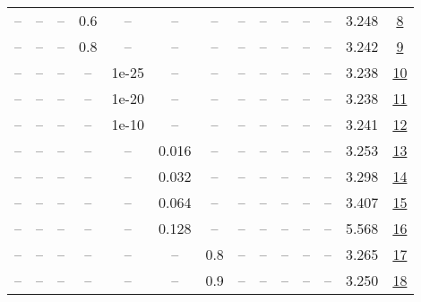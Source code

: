 \begin{table}[H]
\begin{tabular}{cccccccccccccc}
-- & -- & -- & 0.6 & -- & -- & -- & -- & -- & -- & -- & -- & 3.248 & \href{https://wandb.ai/stanford-mercury/optimizer-scaling/runs/sweep-130m-21B-muonc5c7a2lr0.008-wd0.1-minlr0-warmup0-b10.8-b20.-285fdb}{8} \\
-- & -- & -- & 0.8 & -- & -- & -- & -- & -- & -- & -- & -- & 3.242 & \href{https://wandb.ai/stanford-mercury/optimizer-scaling/runs/sweep-130m-21B-muon740327lr0.008-wd0.1-minlr0-warmup0-b10.8-b20.-5585f4}{9} \\
-- & -- & -- & -- & 1e-25 & -- & -- & -- & -- & -- & -- & -- & 3.238 & \href{https://wandb.ai/stanford-mercury/optimizer-scaling/runs/sweep-130m-21B-muon438751lr0.008-wd0.1-minlr0-warmup0-b10.8-b20.-d942b8}{10} \\
-- & -- & -- & -- & 1e-20 & -- & -- & -- & -- & -- & -- & -- & 3.238 & \href{https://wandb.ai/stanford-mercury/optimizer-scaling/runs/sweep-130m-21B-muonadb698lr0.008-wd0.1-minlr0-warmup0-b10.8-b20.-d2374c}{11} \\
-- & -- & -- & -- & 1e-10 & -- & -- & -- & -- & -- & -- & -- & 3.241 & \href{https://wandb.ai/stanford-mercury/optimizer-scaling/runs/sweep-130m-21B-muoned85fdlr0.008-wd0.1-minlr0-warmup0-b10.8-b20.-c84b6d}{12} \\
-- & -- & -- & -- & -- & 0.016 & -- & -- & -- & -- & -- & -- & 3.253 & \href{https://wandb.ai/stanford-mercury/optimizer-scaling/runs/sweep-130m-21B-muon106105lr0.016-wd0.1-minlr0-warmup0-b10.8-b20.-145c38}{13} \\
-- & -- & -- & -- & -- & 0.032 & -- & -- & -- & -- & -- & -- & 3.298 & \href{https://wandb.ai/stanford-mercury/optimizer-scaling/runs/sweep-130m-21B-muon8561f0lr0.032-wd0.1-minlr0-warmup0-b10.8-b20.-2b4c80}{14} \\
-- & -- & -- & -- & -- & 0.064 & -- & -- & -- & -- & -- & -- & 3.407 & \href{https://wandb.ai/stanford-mercury/optimizer-scaling/runs/sweep-130m-21B-muonc0fdedlr0.064-wd0.1-minlr0-warmup0-b10.8-b20.-de3c13}{15} \\
-- & -- & -- & -- & -- & 0.128 & -- & -- & -- & -- & -- & -- & 5.568 & \href{https://wandb.ai/stanford-mercury/optimizer-scaling/runs/sweep-130m-21B-muona3b5c1lr0.128-wd0.1-minlr0-warmup0-b10.8-b20.-2bfad0}{16} \\
-- & -- & -- & -- & -- & -- & 0.8 & -- & -- & -- & -- & -- & 3.265 & \href{https://wandb.ai/stanford-mercury/optimizer-scaling/runs/sweep-130m-21B-muon118538lr0.008-wd0.1-minlr0-warmup0-b10.8-b20.-1a35c1}{17} \\
-- & -- & -- & -- & -- & -- & 0.9 & -- & -- & -- & -- & -- & 3.250 & \href{https://wandb.ai/stanford-mercury/optimizer-scaling/runs/sweep-130m-21B-muon5b982elr0.008-wd0.1-minlr0-warmup0-b10.8-b20.-f92115}{18} \\

\end{tabular}
\end{table}
